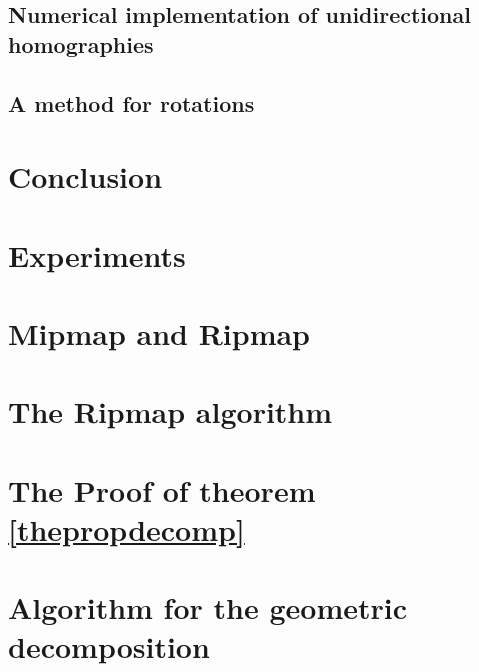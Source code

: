 \documentclass[a4paper,11pt]{article}
\theoremstyle{plain}
\theoremstyle{definition}
\begin{document}
		\subsection{Numerical implementation of unidirectional homographies}
			\label{HomoboxRipmap}
		\subsection{A method for rotations}
			\label{YaroSzeli}
	\clearpage
	\section*{Conclusion}
			
	\clearpage
	\section{Experiments}
		\label{experiences}
		
		\clearpage
		
		\clearpage
		
		\clearpage
		
		\clearpage
	\appendix
	\section{Mipmap and Ripmap}
           \label{Mipmap_pseudo_code_jt}
	\label{pseudo_code}
	\section{The Ripmap algorithm}
                 \label{Ripmap_pseudo_code_jt}
	\section{The Proof of theorem \ref{thepropdecomp}}
	        
	\section{Algorithm for the geometric decomposition}
		
	\nocite{*}
	
	
\end{document}

